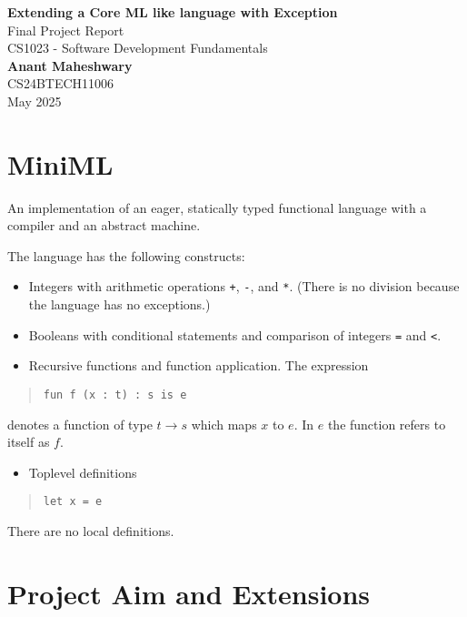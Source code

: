 \documentclass[a4paper,12pt]{article}
\begin{document}
\begin{center}
    {\LARGE \textbf{Extending a Core ML like language with Exception}}\\[1.5cm]
    {\large Final Project Report}\\
    {\large CS1023 - Software Development Fundamentals}\\[1.5cm]
    {\Large \textbf{Anant Maheshwary}}\\
    CS24BTECH11006\\[1.5cm]
    May 2025
\end{center}

\section{MiniML}

An implementation of an eager, statically typed functional language with a compiler and an abstract machine.

The language has the following constructs:
\begin{itemize}[left=0.5cm]
    \item Integers with arithmetic operations \texttt{+}, \texttt{-}, and \texttt{*}. (There is no division because the language has no exceptions.)
    \item Booleans with conditional statements and comparison of integers \texttt{=} and \texttt{<}.
    \item Recursive functions and function application. The expression
\end{itemize}

\begin{quote}
\texttt{fun f (x : t) : s is e}
\end{quote}

denotes a function of type $t \rightarrow s$ which maps $x$ to $e$. In $e$ the function refers to itself as $f$.

\begin{itemize}[left=0.5cm]
    \item Toplevel definitions
\end{itemize}

\begin{quote}
\texttt{let x = e}
\end{quote}

There are no local definitions.

\section{Project Aim and Extensions}
\end{document}
